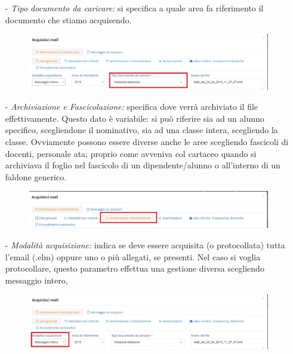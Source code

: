 \documentclass[a4paper,italian,12pt]{book}
\begin{document}
\begin{itemize}
\item[-] \textit{Tipo documento da caricare:} si specifica a quale area fa riferimento il documento che stiamo acquisendo.
\begin{figure}[ht]
\centering
\includegraphics[scale=0.5]{Figure/tipo_doc.jpg} 
\end{figure}
\item[-] \textit{Archiviazione e Fascicolazione:} specifica dove verrà archiviato il file effettivamente. Questo dato è variabile: si può riferire sia ad un alunno specifico, scegliendone il nominativo, sia ad una classe intera, scegliendo la classe. Ovviamente possono essere diverse anche le aree scegliendo fascicoli di docenti, personale ata; proprio come avveniva col cartaceo quando si archiviava il foglio nel fascicolo di un dipendente/alunno o all'interno di un faldone generico.
\begin{figure}[ht]
\centering
\includegraphics[scale=0.5]{Figure/arch_fasc_ev.jpg} 
\end{figure}
\item[-] \textit{Modalità acquisizione:} indica se deve essere acquisita (o protocollata) tutta l'email (.elm) oppure uno o più allegati, se presenti. Nel caso si voglia protocollare, questo parametro effettua una gestione diversa scegliendo messaggio intero,
\begin{figure}[ht]
\centering
\includegraphics[scale=0.5]{Figure/mod_acquis.jpg} 

\end{figure}
\end{itemize}
\end{document}
